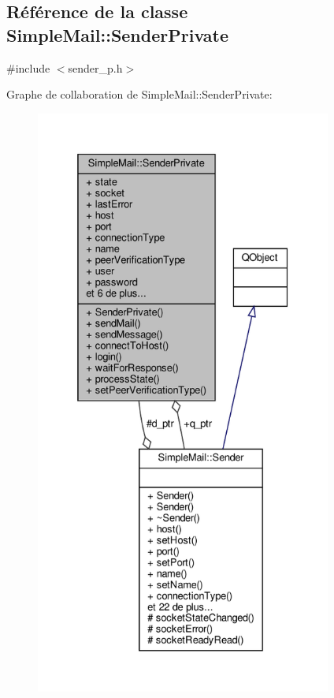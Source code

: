 \hypertarget{class_simple_mail_1_1_sender_private}{}\subsection{Référence de la classe Simple\+Mail\+:\+:Sender\+Private}
\label{class_simple_mail_1_1_sender_private}


{\ttfamily \#include $<$sender\+\_\+p.\+h$>$}



Graphe de collaboration de Simple\+Mail\+:\+:Sender\+Private\+:\nopagebreak
\begin{figure}[H]
\begin{center}
\leavevmode
\includegraphics[height=550pt]{class_simple_mail_1_1_sender_private__coll__graph}
\end{center}
\end{figure}

